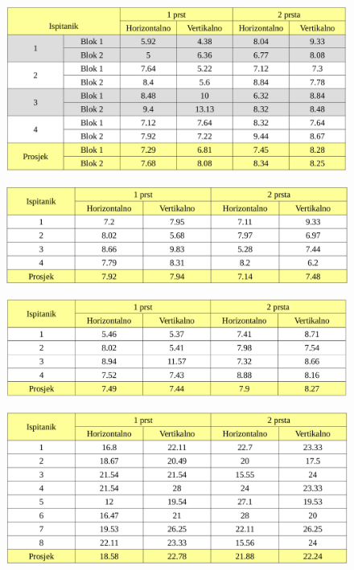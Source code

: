 \documentclass[times, utf8, zavrsni]{fer}
\begin{document}
\begin{figure}[htb]
\centering
\includegraphics[width=12cm]{img/furykey2_sve.png}
\label{tab:furykey2_sve}
\end{figure}

\begin{figure}[htb]
\centering
\includegraphics[width=12cm]{img/furykey1_prosjek.png}
\label{tab:furykey1_avg}
\end{figure}

\begin{figure}[htb]
\centering
\includegraphics[width=12cm]{img/furykey2_prosjek.png}
\label{tab:furykey2_avg}
\end{figure}

\begin{figure}[htb]
\centering
\includegraphics[width=12cm]{img/qwertz_sve.png}
\label{tab:qwertz_sve}
\end{figure}
\end{document}
